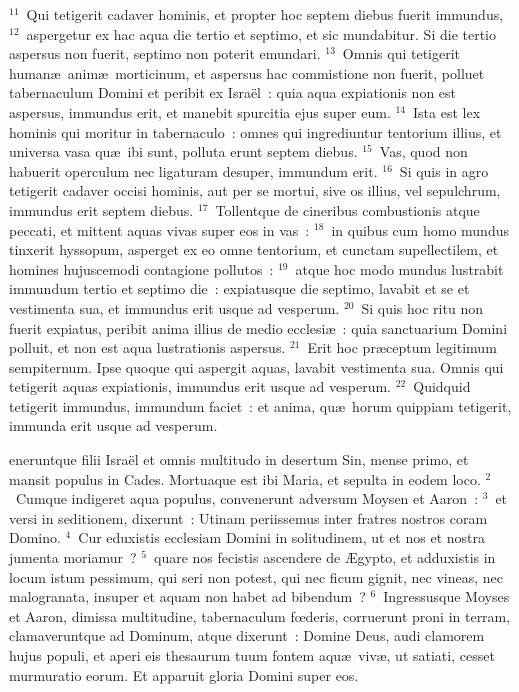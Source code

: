 ${}^{11}$~Qui tetigerit cadaver hominis, et propter hoc septem diebus fuerit immundus,
${}^{12}$~aspergetur ex hac aqua die tertio et septimo, et sic mundabitur. Si die tertio aspersus non fuerit, septimo non poterit emundari.
${}^{13}$~Omnis qui tetigerit human\ae\ anim\ae\ morticinum, et aspersus hac commistione non fuerit, polluet tabernaculum Domini et peribit ex Isra\"el~: quia aqua expiationis non est aspersus, immundus erit, et manebit spurcitia ejus super eum.
${}^{14}$~Ista est lex hominis qui moritur in tabernaculo~: omnes qui ingrediuntur tentorium illius, et universa vasa qu\ae\ ibi sunt, polluta erunt septem diebus.
${}^{15}$~Vas, quod non habuerit operculum nec ligaturam desuper, immundum erit.
${}^{16}$~Si quis in agro tetigerit cadaver occisi hominis, aut per se mortui, sive os illius, vel sepulchrum, immundus erit septem diebus.
${}^{17}$~Tollentque de cineribus combustionis atque peccati, et mittent aquas vivas super eos in vas~:
${}^{18}$~in quibus cum homo mundus tinxerit hyssopum, asperget ex eo omne tentorium, et cunctam supellectilem, et homines hujuscemodi contagione pollutos~:
${}^{19}$~atque hoc modo mundus lustrabit immundum tertio et septimo die~: expiatusque die septimo, lavabit et se et vestimenta sua, et immundus erit usque ad vesperum.
${}^{20}$~Si quis hoc ritu non fuerit expiatus, peribit anima illius de medio ecclesi\ae~: quia sanctuarium Domini polluit, et non est aqua lustrationis aspersus.
${}^{21}$~Erit hoc pr\ae ceptum legitimum sempiternum. Ipse quoque qui aspergit aquas, lavabit vestimenta sua. Omnis qui tetigerit aquas expiationis, immundus erit usque ad vesperum.
${}^{22}$~Quidquid tetigerit immundus, immundum faciet~: et anima, qu\ae\ horum quippiam tetigerit, immunda erit usque ad vesperum.

\bchapter
{}eneruntque filii Isra\"el et omnis multitudo in desertum Sin, mense primo, et mansit populus in Cades. Mortuaque est ibi Maria, et sepulta in eodem loco.
${}^{2}$~Cumque indigeret aqua populus, convenerunt adversum Moysen et Aaron~:
${}^{3}$~et versi in seditionem, dixerunt~: Utinam periissemus inter fratres nostros coram Domino.
${}^{4}$~Cur eduxistis ecclesiam Domini in solitudinem, ut et nos et nostra jumenta moriamur~?
${}^{5}$~quare nos fecistis ascendere de \AE gypto, et adduxistis in locum istum pessimum, qui seri non potest, qui nec ficum gignit, nec vineas, nec malogranata, insuper et aquam non habet ad bibendum~?
${}^{6}$~Ingressusque Moyses et Aaron, dimissa multitudine, tabernaculum fœderis, corruerunt proni in terram, clamaveruntque ad Dominum, atque dixerunt~: Domine Deus, audi clamorem hujus populi, et aperi eis thesaurum tuum fontem aqu\ae\ viv\ae , ut satiati, cesset murmuratio eorum. Et apparuit gloria Domini super eos.


